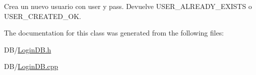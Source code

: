 Crea un nuevo usuario con user y pass. Devuelve U\+S\+E\+R\+\_\+\+A\+L\+R\+E\+A\+D\+Y\+\_\+\+E\+X\+I\+S\+T\+S o U\+S\+E\+R\+\_\+\+C\+R\+E\+A\+T\+E\+D\+\_\+\+O\+K. 



The documentation for this class was generated from the following files\+:\begin{DoxyCompactItemize}
\item 
D\+B/\hyperlink{_login_d_b_8h}{Login\+D\+B.\+h}\item 
D\+B/\hyperlink{_login_d_b_8cpp}{Login\+D\+B.\+cpp}\end{DoxyCompactItemize}
